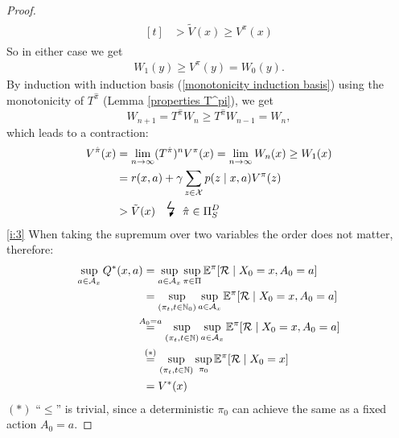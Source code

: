 \begin{proof}
\begin{align*}
\begin{aligned}[t]
			&> \tilde{V}(x) \ge V^\pi(x)
		\end{aligned}
	\end{align*}
	So in either case we get 
	\begin{align}\label{monotonicity induction basis}
		W_1(y)\ge V^\pi(y)=W_0(y).
	\end{align}
	By induction with induction basis (\ref{monotonicity induction basis}) using the monotonicity of \(T^{\hat{\pi}}\) (Lemma \ref{properties T^pi}), we get 
	\[
		W_{n+1}=T^{\hat{\pi}}W_n \ge T^{\hat{\pi}}W_{n-1}=W_n,
	\] 
	which leads to a contraction:
	\begin{align*}
		V^{\hat{\pi}}(x)&=\lim_{n\to\infty}(T^{\hat{\pi}})^n V^\pi(x)=\lim_{n\to\infty} W_n(x)\ge W_1(x) \\
		&=r(x, a) + \gamma \sum_{z\in\cX} p(z \mid x, a) V^\pi(z) \\
		&> \tilde{V}(x) \contradiction{\hat{\pi}\in\detPolicy}
	\end{align*}
	\ref{i:3} When taking the supremum over two variables the order does not matter, therefore:
	\begin{align}
		\sup_{a\in\cA_x} Q^*(x,a) 
		\nonumber
		&= \sup_{a\in\cA_x} \sup_{\pi\in\Pi}\E^\pi[\cR\mid X_0=x, A_0=a]
		\nonumber \\
		&=\sup_{(\pi_t,t\in\N_0)}\sup_{a\in\cA_x}\E^\pi[\cR\mid X_0=x, A_0=a]
		\nonumber\\
		&\lxeq{A_0=a}\sup_{(\pi_t,t\in\N)}\sup_{a\in\cA_x}\E^\pi[\cR\mid X_0=x, A_0=a]
		\nonumber\\
		&\lxeq{(*)}\sup_{(\pi_t,t\in\N)}\sup_{\pi_0}\E^\pi[\cR\mid X_0=x]
		\label{clarifiction:sup pi_0 = sup_a}\\
		&=V^*(x) \nonumber
	\end{align}
	\((*)\) ``\(\leq\)'' is trivial, since a deterministic \(\pi_0\) can achieve the same as a fixed action \(A_0=a\).


\end{proof}
